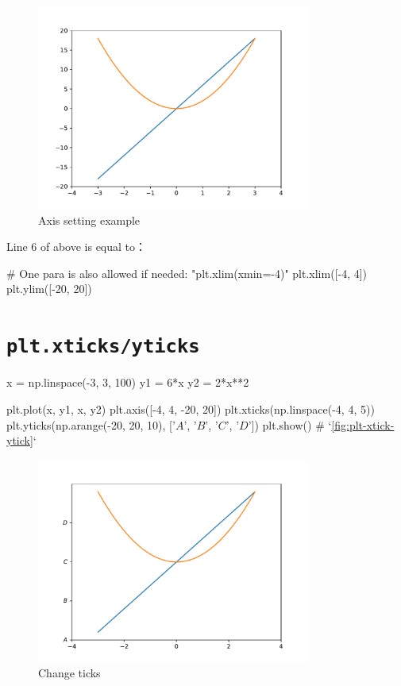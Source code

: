 \documentclass{report}
\begin{document}
\begin{figure}[!htb]
  \centering
  \includegraphics[width=90mm]{plt-axis}
  \caption{Axis setting example}
  \label{fig:plt-axis}
\end{figure}

Line 6 of above is equal to：
\begin{py}
# One para is also allowed if needed: "plt.xlim(xmin=-4)"
plt.xlim([-4, 4]) 
plt.ylim([-20, 20])
\end{py}

\section{\texttt{plt.xticks/yticks}}
\begin{py}
x = np.linspace(-3, 3, 100)
y1 = 6*x
y2 = 2*x**2

plt.plot(x, y1, x, y2)
plt.axis([-4, 4, -20, 20])
plt.xticks(np.linspace(-4, 4, 5))
plt.yticks(np.arange(-20, 20, 10), ['$A$', '$B$', '$C$', '$D$'])
plt.show() # `\autoref{fig:plt-xtick-ytick}`
\end{py}

\begin{figure}[!htb]
  \centering
  \includegraphics[width=90mm]{plt-xtick-ytick}
  \caption{Change ticks}
  \label{fig:plt-xtick-ytick}
\end{figure}
\end{document}
